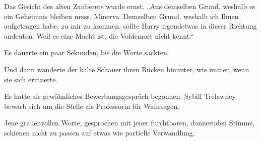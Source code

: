 Das Gesicht des alten Zauberers wurde ernst. „Aus demselben Grund, weshalb es ein Geheimnis bleiben muss, Minerva. Demselben Grund, weshalb ich Ihnen aufgetragen habe, zu mir zu kommen, sollte Harry irgendetwas in dieser Richtung andeuten. Weil es eine Macht ist, die Voldemort nicht kennt.“

Es dauerte ein paar Sekunden, bis die Worte sackten.

Und dann wanderte der kalte Schauer ihren Rücken hinunter, wie immer, wenn sie sich erinnerte.

Es hatte als gewöhnliches Bewerbungsgespräch begonnen, Sybill Trelawney bewarb sich um die Stelle als Professorin für Wahrsagen.


Jene grauenvollen Worte, gesprochen mit jener furchtbaren, donnernden Stimme, schienen nicht zu passen auf etwas wie partielle Verwandlung.

